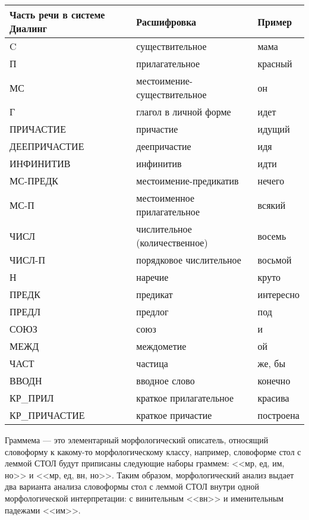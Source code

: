\documentclass[12pt,a4paper,onecolumn]{report}
\begin{document}
\begin{center}
\begin{spacing}{1}
\begin{tabular}{| l | l | l | }
\hline
Часть речи в системе Диалинг & Расшифровка    & Пример\\[2pt] \hline
C             & существительное               & мама\\ \hline
П             & прилагательное                & красный\\ \hline
МС            & местоимение-существительное   & он\\ \hline
Г             & глагол в личной форме         & идет\\ \hline
ПРИЧАСТИЕ     & причастие                     & идущий\\ \hline
ДЕЕПРИЧАСТИЕ  & деепричастие                  & идя\\ \hline
ИНФИНИТИВ     & инфинитив                     & идти\\ \hline
МС-ПРЕДК      & местоимение-предикатив        & нечего\\ \hline
МС-П          & местоименное прилагательное   & всякий\\ \hline
ЧИСЛ          & числительное (количественное) & восемь\\ \hline
ЧИСЛ-П        & порядковое числительное       & восьмой\\ \hline
Н             & наречие                       & круто\\ \hline
ПРЕДК         & предикат                      & интересно\\ \hline
ПРЕДЛ         & предлог                       & под\\ \hline
СОЮЗ          & союз                          & и\\ \hline
МЕЖД          & междометие                    & ой\\ \hline
ЧАСТ          & частица                       & же, бы\\ \hline
ВВОДН         & вводное слово                 & конечно\\ \hline
КР\_ПРИЛ      & краткое прилагательное        & красива\\ \hline
КР\_ПРИЧАСТИЕ & краткое причастие             & построена\\ \hline
\end{tabular}
\end{spacing}
\end{center}

Граммема --- это элементарный морфологический описатель, относящий словоформу к какому-то морфологическому классу, например, словоформе стол с леммой СТОЛ будут приписаны следующие наборы граммем: <<мр, ед, им, но>> и <<мр, ед, вн, но>>. Таким образом, морфологический анализ выдает два варианта анализа  словоформы стол с леммой СТОЛ внутри одной морфологической интерпретации: с винительным <<вн>> и именительным падежами <<им>>.
\end{document}
